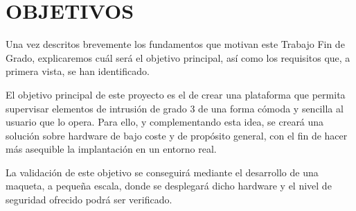 \documentclass{pre-tfg}
\begin{document}
\pagebreak

\section{OBJETIVOS}





Una vez descritos brevemente los fundamentos que motivan este Trabajo Fin de Grado,
explicaremos cuál será el objetivo principal, así como los requisitos que, a primera
vista, se han identificado.

El objetivo principal de este proyecto es el de crear una plataforma que permita
supervisar elementos de intrusión de grado 3 de una forma cómoda y sencilla al usuario que lo
opera. Para ello, y complementando esta idea, se creará una solución sobre hardware de bajo
coste y de propósito general, con el fin de hacer más asequible la implantación en un
entorno real.

La validación de este objetivo se conseguirá mediante el desarrollo de una
maqueta, a pequeña escala, donde se desplegará dicho hardware y el nivel de seguridad
ofrecido podrá ser verificado.
\end{document}
